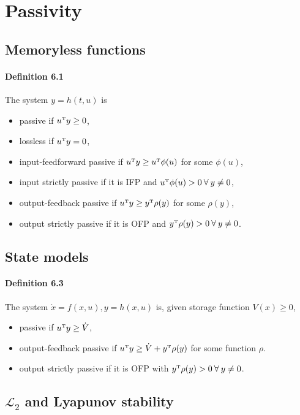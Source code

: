 \section{Passivity}

\subsection{Memoryless functions}
\paragraph{Definition 6.1}
The system $y = h(t,u)$ is
\begin{itemize}
	\item passive if $u^{\scriptscriptstyle \mathrm{T}} y \geq 0$,
	\item lossless if $u^{\scriptscriptstyle \mathrm{T}} y = 0$,
	\item input-feedforward passive if $u^{\scriptscriptstyle \mathrm{T}} y \geq u^{\scriptscriptstyle \mathrm{T}} \phi(u)$ for some $\phi(u)$,
	\item input strictly passive if it is IFP and $u^{\scriptscriptstyle \mathrm{T}} \phi(u) > 0 \: \forall \: y \neq 0$,
	\item output-feedback passive if $u^{\scriptscriptstyle \mathrm{T}} y \geq y^{\scriptscriptstyle \mathrm{T}} \rho(y)$ for some $\rho(y)$,
	\item output strictly passive if it is OFP and $y^{\scriptscriptstyle \mathrm{T}} \rho(y) > 0 \: \forall \: y \neq 0$.
\end{itemize}

\subsection{State models}
\paragraph{Definition 6.3}
The system $\dot{x} = f(x,u), y = h(x,u)$ is, given storage function $V(x) \geq 0$,
\begin{itemize}
	\item passive if $u^{\scriptscriptstyle \mathrm{T}} y \geq \dot{V}$,
	\item output-feedback passive if $u^{\scriptscriptstyle \mathrm{T}} y \geq \dot{V} + y^{\scriptscriptstyle \mathrm{T}} \rho(y)$ for some function $\rho$.
	\item output strictly passive if it is OFP with $y^{\scriptscriptstyle \mathrm{T}} \rho(y) > 0 \: \forall \: y \neq 0$.
\end{itemize}

\subsection{$\mathcal{L}_2$ and Lyapunov stability}
